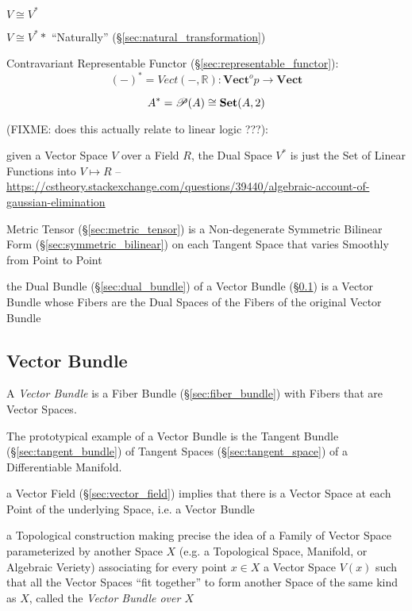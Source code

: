 $V \cong V^*$

$V \cong V^**$ ``Naturally'' (\S\ref{sec:natural_transformation})

Contravariant Representable Functor
(\S\ref{sec:representable_functor}):
\[
  (-)^* = Vect(-,\mathbb{R}) :
    \mathbf{Vect}^op \rightarrow \mathbf{Vect}
\]

\[
  A^* = \mathscr{P}(A) \cong \mathbf{Set}(A,2)
\]\cite{awodey06}

(FIXME: does this actually relate to linear logic ???):

given a Vector Space $V$ over a Field $R$, the Dual Space $V^*$ is just the Set
of Linear Functions into $V \mapsto R$
--\url{https://cstheory.stackexchange.com/questions/39440/algebraic-account-of-gaussian-elimination}

Metric Tensor (\S\ref{sec:metric_tensor}) is a Non-degenerate Symmetric Bilinear
Form (\S\ref{sec:symmetric_bilinear}) on each Tangent Space that varies Smoothly
from Point to Point

the Dual Bundle (\S\ref{sec:dual_bundle}) of a Vector Bundle
(\S\ref{sec:vector_bundle}) is a Vector Bundle whose Fibers are the Dual Spaces
of the Fibers of the original Vector Bundle



\subsection{Vector Bundle}\label{sec:vector_bundle}


A \emph{Vector Bundle} is a Fiber Bundle (\S\ref{sec:fiber_bundle}) with Fibers
that are Vector Spaces.

The prototypical example of a Vector Bundle is the Tangent Bundle
(\S\ref{sec:tangent_bundle}) of Tangent Spaces (\S\ref{sec:tangent_space}) of a
Differentiable Manifold.

a Vector Field (\S\ref{sec:vector_field}) implies that there is a Vector Space
at each Point of the underlying Space, i.e. a Vector Bundle

a Topological construction making precise the idea of a Family of Vector Space
parameterized by another Space $X$ (e.g. a Topological Space, Manifold, or
Algebraic Veriety) associating for every point $x \in X$ a Vector Space $V(x)$
such that all the Vector Spaces ``fit together'' to form another Space of the
same kind as $X$, called the \emph{Vector Bundle over $X$}

